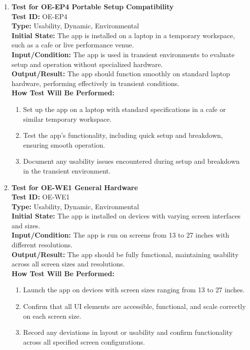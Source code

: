\documentclass[12pt, titlepage]{article}
\begin{document}
\begin{enumerate}
    \item \textbf{Test for OE-EP4 Portable Setup Compatibility} \\
      \newline
      \textbf{Test ID:} OE-EP4 \\
      \textbf{Type:} Usability, Dynamic, Environmental \\
      \textbf{Initial State:} The app is installed on a laptop in a temporary workspace, such as a cafe or live performance venue. \\
      \textbf{Input/Condition:} The app is used in transient environments to evaluate setup and operation without specialized hardware. \\
      \textbf{Output/Result:} The app should function smoothly on standard laptop hardware, performing effectively in transient conditions. \\
      \textbf{How Test Will Be Performed:}
      \begin{enumerate}
          \item Set up the app on a laptop with standard specifications in a cafe or similar temporary workspace.
          \item Test the app’s functionality, including quick setup and breakdown, ensuring smooth operation.
          \item Document any usability issues encountered during setup and breakdown in the transient environment.
      \end{enumerate}

    \item \textbf{Test for OE-WE1 General Hardware} \\
      \newline
      \textbf{Test ID:} OE-WE1 \\
      \textbf{Type:} Usability, Dynamic, Environmental \\
      \textbf{Initial State:} The app is installed on devices with varying screen interfaces and sizes. \\
      \textbf{Input/Condition:} The app is run on screens from 13 to 27 inches with different resolutions. \\
      \textbf{Output/Result:} The app should be fully functional, maintaining usability across all screen sizes and resolutions. \\
      \textbf{How Test Will Be Performed:}
      \begin{enumerate}
          \item Launch the app on devices with screen sizes ranging from 13 to 27 inches.
          \item Confirm that all UI elements are accessible, functional, and scale correctly on each screen size.
          \item Record any deviations in layout or usability and confirm functionality across all specified screen configurations.
      \end{enumerate}


\end{enumerate}
\end{document}
